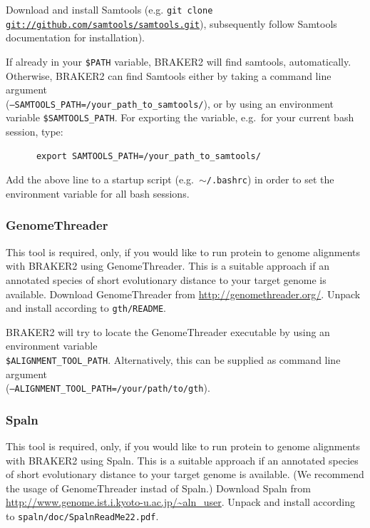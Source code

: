 \documentclass[a4paper,10pt]{report}
\begin{document}
      Download and install Samtools (e.g. \texttt{git clone \url{git://github.com/samtools/samtools.git}}), 
      subsequently follow Samtools documentation for installation).    

      If already in your \texttt{\$PATH} variable, BRAKER2 will find samtools, automatically. Otherwise, BRAKER2 can find Samtools either by taking a command line argument\\ (\texttt{--SAMTOOLS\_PATH=/your\_path\_to\_samtools/}), or by using an environment variable \texttt{\$SAMTOOLS\_PATH}. For exporting the variable, e.g.~for your current bash session, type:

    \begin{verbatim}
      export SAMTOOLS_PATH=/your_path_to_samtools/
    \end{verbatim}
    
        Add the above line to a startup script (e.g.~\texttt{$\sim$/.bashrc}) in order to set the environment variable for all bash sessions.
\subsubsection{GenomeThreader}

This tool is required, only, if you would like to run protein to genome alignments with BRAKER2 using GenomeThreader. This is a suitable approach if an annotated species of short evolutionary distance to your target genome is available. Download GenomeThreader from \url{http://genomethreader.org/}. Unpack and install according to \texttt{gth/README}.

BRAKER2 will try to locate the GenomeThreader executable by using an environment variable\\\texttt{\$ALIGNMENT\_TOOL\_PATH}. Alternatively, this can be supplied as command line argument \\(\texttt{--ALIGNMENT\_TOOL\_PATH=/your/path/to/gth}).

\subsubsection{Spaln}

This tool is required, only, if you would like to run protein to genome alignments with BRAKER2 using Spaln. This is a suitable approach if an annotated species of short evolutionary distance to your target genome is available. (We recommend the usage of GenomeThreader instad of Spaln.) Download Spaln from \url{http://www.genome.ist.i.kyoto-u.ac.jp/~aln_user}. Unpack and install according to \texttt{spaln/doc/SpalnReadMe22.pdf}.
\end{document}
